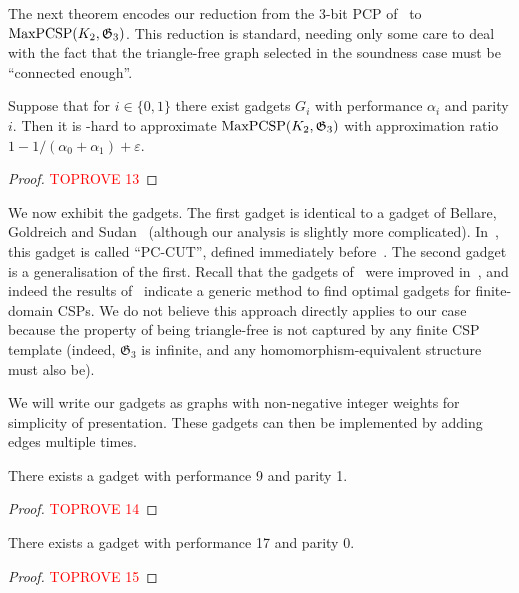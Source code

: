 \documentclass[a4paper,11pt, DIV=11]{scrartcl}
\renewcommand{\epsilon}{\varepsilon}
\renewcommand{\G}{\ensuremath{\mathfrak{G}}}
\DeclareMathOperator{\maxPCSP}{\textup{MaxPCSP}}
\theoremstyle{plain}
\theoremstyle{definition}
\begin{document}
The next theorem encodes our reduction from 
the 3-bit PCP of~\cite{Hastad01} to $\maxPCSP(K_2, \G_3)$. This reduction is standard, needing only some care to deal with the fact that the triangle-free graph selected in the soundness case must be ``connected enough''.

\begin{theorem}
    Suppose that for $i \in \{0, 1\}$ there exist gadgets $G_i$ with performance $\alpha_i$ and parity $i$. Then it is \NP-hard to approximate $\maxPCSP(K_2, \G_3)$  with approximation ratio $1 - 1 / (\alpha_0 + \alpha_1) + \epsilon$.
\end{theorem}
\begin{proof}\textcolor{red}{TOPROVE 13}\end{proof}
 
We now exhibit the gadgets. The first gadget is identical to a gadget of Bellare, Goldreich and Sudan~\cite{BGS:98} (although our analysis is slightly more complicated). In~\cite{BGS:98}, this gadget is called ``PC-CUT'', defined immediately before~\cite[Claim~4.17]{BGS:98}. The second gadget is a generalisation of the first. Recall that the gadgets of~\cite{BGS:98} were improved in~\cite{Trevisan00:sicomp}, and indeed the results of~\cite{Trevisan00:sicomp} indicate a generic method to find optimal gadgets for finite-domain CSPs. We do not believe this approach directly applies to our case because the property of being triangle-free is not captured by any finite CSP template (indeed, $\G_3$ is infinite, and any homomorphism-equivalent structure must also be).

We will write our gadgets as graphs with non-negative integer weights for simplicity of presentation. These gadgets can then be implemented by adding edges multiple times.



\begin{lemma}
    There exists a gadget with performance 9 and parity 1.
\end{lemma}
\begin{proof}\textcolor{red}{TOPROVE 14}\end{proof}

\begin{lemma}
    There exists a gadget with performance 17 and parity 0.
\end{lemma}
\begin{proof}\textcolor{red}{TOPROVE 15}\end{proof}

\newpage
\end{document}
